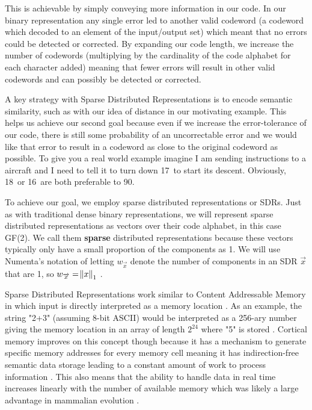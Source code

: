 \documentclass[fleqn,notitlepage,minimal]{article}
\begin{document}
	This is achievable by simply conveying more information in our code. In our binary representation any single error led to another valid codeword (a codeword which decoded to an element of the input/output set) which meant that no errors could be detected or corrected. By expanding our code length, we increase the number of codewords (multiplying by the cardinality of the code alphabet for each character added) meaning that fewer errors will result in other valid codewords and can possibly be detected or corrected. 
	
	A key strategy with Sparse Distributed Representations is to encode semantic similarity, such as with our idea of distance in our motivating example. This helps us achieve our second goal because even if we increase the error-tolerance of our code, there is still some probability of an uncorrectable error and we would like that error to result in a codeword as close to the original codeword as possible. To give you a real world example imagine I am sending instructions to a aircraft and I need to tell it to turn down 17\textdegree \ to start its descent. Obviously, 18\textdegree \ or 16\textdegree \ are both preferable to 90\textdegree.
	
	To achieve our goal, we employ sparse distributed representations or SDRs. Just as with traditional dense binary representations, we will represent sparse distributed representations as vectors over their code alphabet, in this case GF(2). We call them \textbf{sparse} distributed representations because these vectors typically only have a small proportion of the components as 1. We will use Numenta's notation of letting $w_{\overrightarrow{x}}$ denote the number of components in an SDR $\overrightarrow{x}$ that are 1, so $w_{\overrightarrow{x}} = \norm{x}_{1}$ \cite{Properties}.
	
	Sparse Distributed Representations work similar to Content Addressable Memory in which input is directly interpreted as a memory location \cite{Semantic}. As an example, the string "2+3" (assuming 8-bit ASCII) would be interpreted as a 256-ary number giving the memory location in an array of length $2^{24}$ where "5" is stored \cite{Semantic}. Cortical memory improves on this concept though because it has a mechanism to generate specific memory addresses for every memory cell meaning it has indirection-free semantic data storage leading to a constant amount of work to process information \cite{Semantic}. This also means that the ability to handle data in real time increases linearly with the number of available memory which was likely a large advantage in mammalian evolution \cite{Semantic}.
	
\end{document}

